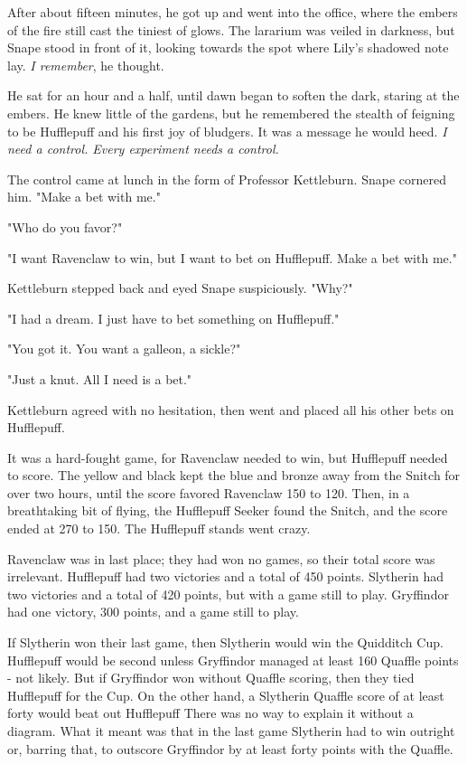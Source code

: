 After about fifteen minutes, he got up and went into the office, where the embers of the fire still cast the tiniest of glows. The lararium was veiled in darkness, but Snape stood in front of it, looking towards the spot where Lily's shadowed note lay. \emph{I remember}, he thought.

He sat for an hour and a half, until dawn began to soften the dark, staring at the embers. He knew little of the gardens, but he remembered the stealth of feigning to be Hufflepuff and his first joy of bludgers. It was a message he would heed. \emph{I need a control. Every experiment needs a control.}

The control came at lunch in the form of Professor Kettleburn. Snape cornered him. "Make a bet with me."

"Who do you favor?"

"I want Ravenclaw to win, but I want to bet on Hufflepuff. Make a bet with me."

Kettleburn stepped back and eyed Snape suspiciously. "Why?"

"I had a dream. I just have to bet something on Hufflepuff."

"You got it. You want a galleon, a sickle?"

"Just a knut. All I need is a bet."

Kettleburn agreed with no hesitation, then went and placed all his other bets on Hufflepuff.

It was a hard-fought game, for Ravenclaw needed to win, but Hufflepuff needed to score. The yellow and black kept the blue and bronze away from the Snitch for over two hours, until the score favored Ravenclaw 150 to 120. Then, in a breathtaking bit of flying, the Hufflepuff Seeker found the Snitch, and the score ended at 270 to 150. The Hufflepuff stands went crazy.

Ravenclaw was in last place; they had won no games, so their total score was irrelevant. Hufflepuff had two victories and a total of 450 points. Slytherin had two victories and a total of 420 points, but with a game still to play. Gryffindor had one victory, 300 points, and a game still to play.

If Slytherin won their last game, then Slytherin would win the Quidditch Cup. Hufflepuff would be second unless Gryffindor managed at least 160 Quaffle points - not likely. But if Gryffindor won without Quaffle scoring, then they tied Hufflepuff for the Cup. On the other hand, a Slytherin Quaffle score of at least forty would beat out Hufflepuff{\el} There was no way to explain it without a diagram. What it meant was that in the last game Slytherin had to win outright or, barring that, to outscore Gryffindor by at least forty points with the Quaffle.

